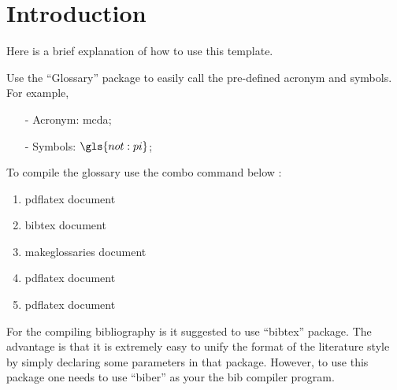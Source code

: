 \chapter{Introduction}\label{ch:intro}

Here is a brief explanation of how to use this template.

Use the ``Glossary'' package to easily call the pre-defined acronym and symbols. For example,

\begin{enumerate}
\item[-] Acronym:  \acs{mcda};
\item[-] Symbols: $\gls{not:pi}$;
\end{enumerate}

To compile the glossary use the combo command below : 

\begin{enumerate}
\item pdflatex document
\item bibtex document
\item makeglossaries document
\item pdflatex document
\item pdflatex document
\end{enumerate}

For the compiling bibliography is it suggested to use ``bibtex'' package. The advantage is that it is extremely easy to unify the format of the literature style by simply declaring some parameters in that package. However, to use this package one needs to use ``biber'' as your the bib compiler program. 
